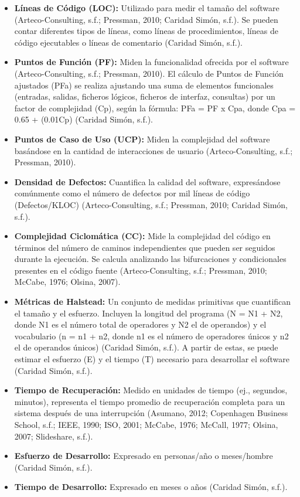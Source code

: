 \documentclass[11pt]{article}
\begin{document}
\begin{itemize}
    \item \textbf{Líneas de Código (LOC):} Utilizado para medir el tamaño del software (Arteco-Consulting, s.f.; Pressman, 2010; Caridad Simón, s.f.). Se pueden contar diferentes tipos de líneas, como líneas de procedimientos, líneas de código ejecutables o líneas de comentario (Caridad Simón, s.f.).
    \item \textbf{Puntos de Función (PF):} Miden la funcionalidad ofrecida por el software (Arteco-Consulting, s.f.; Pressman, 2010). El cálculo de Puntos de Función ajustados (PFa) se realiza ajustando una suma de elementos funcionales (entradas, salidas, ficheros lógicos, ficheros de interfaz, consultas) por un factor de complejidad (Cp), según la fórmula: PFa = PF x Cpa, donde Cpa = 0.65 + (0.01Cp) (Caridad Simón, s.f.).
    \item \textbf{Puntos de Caso de Uso (UCP):} Miden la complejidad del software basándose en la cantidad de interacciones de usuario (Arteco-Consulting, s.f.; Pressman, 2010).
    \item \textbf{Densidad de Defectos:} Cuantifica la calidad del software, expresándose comúnmente como el número de defectos por mil líneas de código (Defectos/KLOC) (Arteco-Consulting, s.f.; Pressman, 2010; Caridad Simón, s.f.).
    \item \textbf{Complejidad Ciclomática (CC):} Mide la complejidad del código en términos del número de caminos independientes que pueden ser seguidos durante la ejecución. Se calcula analizando las bifurcaciones y condicionales presentes en el código fuente (Arteco-Consulting, s.f.; Pressman, 2010; McCabe, 1976; Olsina, 2007).
    \item \textbf{Métricas de Halstead:} Un conjunto de medidas primitivas que cuantifican el tamaño y el esfuerzo. Incluyen la longitud del programa (N = N1 + N2, donde N1 es el número total de operadores y N2 el de operandos) y el vocabulario (n = n1 + n2, donde n1 es el número de operadores únicos y n2 el de operandos únicos) (Caridad Simón, s.f.). A partir de estas, se puede estimar el esfuerzo (E) y el tiempo (T) necesario para desarrollar el software (Caridad Simón, s.f.).
    \item \textbf{Tiempo de Recuperación:} Medido en unidades de tiempo (ej., segundos, minutos), representa el tiempo promedio de recuperación completa para un sistema después de una interrupción (Asumano, 2012; Copenhagen Business School, s.f.; IEEE, 1990; ISO, 2001; McCabe, 1976; McCall, 1977; Olsina, 2007; Slideshare, s.f.).
    \item \textbf{Esfuerzo de Desarrollo:} Expresado en personas/año o meses/hombre (Caridad Simón, s.f.).
    \item \textbf{Tiempo de Desarrollo:} Expresado en meses o años (Caridad Simón, s.f.).
\end{itemize}
\end{document}
